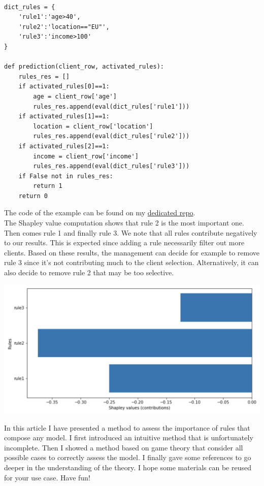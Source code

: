 \lstset{language=Python}
\lstset{frame=lines}
\lstset{basicstyle=\footnotesize}
\begin{lstlisting}

dict_rules = {
    'rule1':'age>40',
    'rule2':'location=="EU"',
    'rule3':'income>100'
}

def prediction(client_row, activated_rules):
    rules_res = []
    if activated_rules[0]==1:
        age = client_row['age']
        rules_res.append(eval(dict_rules['rule1']))
    if activated_rules[1]==1:
        location = client_row['location']
        rules_res.append(eval(dict_rules['rule2']))
    if activated_rules[2]==1:
        income = client_row['income']
        rules_res.append(eval(dict_rules['rule3']))
    if False not in rules_res:
        return 1
    return 0

\end{lstlisting}

The code of the example can be found on my \href{https://github.com/savoga/shap-explain}{dedicated repo}. \\

The Shapley value computation shows that rule 2 is the most important one. Then comes rule 1 and finally rule 3. We note that all rules contribute negatively to our results. This is expected since adding a rule necessarily filter out more clients. Based on these results, the management can decide for example to remove rule 3 since it's not contributing much to the client selection. Alternatively, it can also decide to remove rule 2 that may be too selective.

\begin{center}
\includegraphics[scale=0.6]{./../img/shapley-results.png}
\end{center}

In this article I have presented a method to assess the importance of rules that compose any model. I first introduced an intuitive method that is unfortunately incomplete. Then I showed a method based on game theory that consider all possible cases to correctly assess the model. I finally gave some references to go deeper in the understanding of the theory. I hope some materials can be reused for your use case. Have fun!


\vspace{10mm}